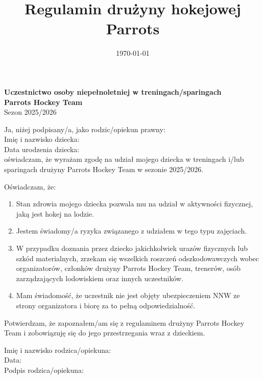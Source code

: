 \documentclass[12pt,a4paper]{article}
\title{Regulamin drużyny hokejowej Parrots}
\date{\today}
\begin{document}
\begin{center}
\textbf{Uczestnictwo osoby niepełnoletniej w treningach/sparingach}\\
\textbf{Parrots Hockey Team}\\
Sezon 2025/2026
\end{center}

\vspace{1em}

Ja, niżej podpisany/a, jako rodzic/opiekun prawny: \\[2em]

\noindent Imię i nazwisko dziecka: \dotfill \\[2em]
Data urodzenia dziecka: \dotfill \\[2em]

\noindent oświadczam, że wyrażam zgodę na udział mojego dziecka w treningach i/lub sparingach drużyny Parrots Hockey Team w sezonie 2025/2026.

\bigskip

\noindent Oświadczam, że:
\begin{enumerate}
  \item Stan zdrowia mojego dziecka pozwala mu na udział w aktywności fizycznej, jaką jest hokej na lodzie.
  \item Jestem świadomy/a ryzyka związanego z udziałem w tego typu zajęciach.
  \item W przypadku doznania przez dziecko jakichkolwiek urazów fizycznych lub szkód materialnych, zrzekam się wszelkich roszczeń odszkodowawczych wobec organizatorów, członków drużyny Parrots Hockey Team, trenerów, osób zarządzających lodowiskiem oraz innych uczestników.
  \item Mam świadomość, że uczestnik nie jest objęty ubezpieczeniem NNW ze strony organizatora i biorę za to pełną odpowiedzialność.
\end{enumerate}

\bigskip

Potwierdzam, że zapoznałem/am się z regulaminem drużyny Parrots Hockey Team i zobowiązuję się do jego przestrzegania wraz z dzieckiem.

\vspace{2em}

\noindent Imię i nazwisko rodzica/opiekuna: \dotfill \\[2em]
Data: \dotfill \\[2em]
Podpis rodzica/opiekuna: \dotfill
\end{document}
